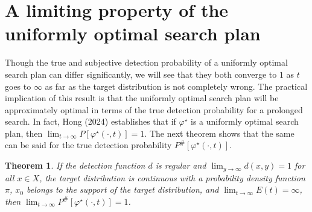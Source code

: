 \documentclass[12pt]{article}
\newtheorem{theorem}{Theorem}[section]
\theoremstyle{plain}
\theoremstyle{definition}
\theoremstyle{remark}
\begin{document}
%
\section{A limiting property of the uniformly optimal search plan}
Though the true and subjective detection probability of a uniformly optimal search plan can differ significantly,  we will see that they both converge to $1$ as $t$ goes to $\infty$ as far as the target distribution is not completely wrong.  The practical implication of this result is that the uniformly optimal search plan will be approximately optimal in terms of the true detection probability for a prolonged search.  In fact, Hong (2024) establishes that if $\varphi^\star$ is a uniformly optimal search plan, then $\lim_{t\rightarrow \infty} P[\varphi^\star(\cdot, t)]=1$.  The next theorem shows that the same can be said for the true detection probability $P^{\#}[\varphi^\star(\cdot, t)]$.  

\begin{theorem}
If the detection function $d$ is regular and $\lim_{y\rightarrow \infty} d(x, y)=1$ for all $x\in X$, the target distribution is continuous with a probability density function $\pi$,  $x_0$ belongs to the support of the target distribution, and $\lim_{t\rightarrow \infty}E(t)=\infty$, then $\lim_{t\rightarrow \infty} P^{\#}[\varphi^\star(\cdot, t)]=1$. 
\end{theorem}
\end{document}
